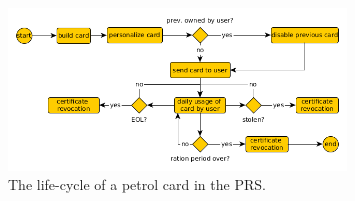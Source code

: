 \begin{itemize}
\begin{figure}[!ht]
  \centering
    \includegraphics[width=0.8\textwidth]{lifecycle}
      \caption{The life-cycle of a petrol card in the PRS.}

\end{figure}

\end{itemize}